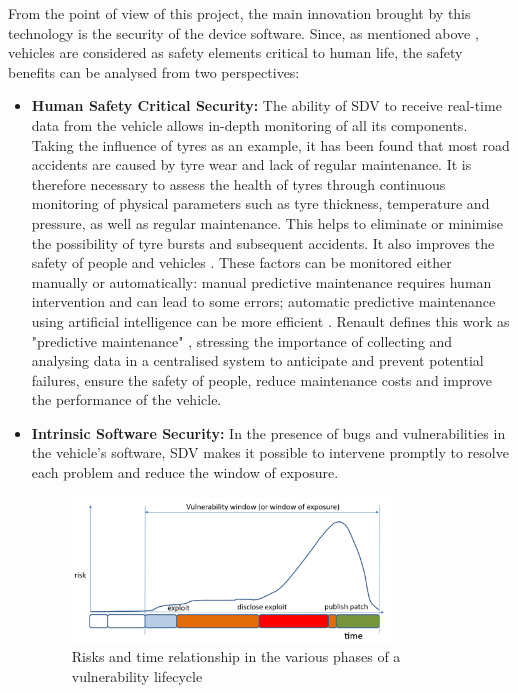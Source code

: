 From the point of view of this project, the main innovation brought by this technology is the security of the device software. Since, as mentioned above \cite{ISO26262}, vehicles are considered as safety elements critical to human life, the safety benefits can be analysed from two perspectives:
\begin{itemize}
    \item \textbf{Human Safety Critical Security:} The ability of SDV to receive real-time data from the vehicle allows in-depth monitoring of all its components. Taking the influence of tyres as an example, it has been found that most road accidents are caused by tyre wear and lack of regular maintenance. It is therefore necessary to assess the health of tyres through continuous monitoring of physical parameters such as tyre thickness, temperature and pressure, as well as regular maintenance. This helps to eliminate or minimise the possibility of tyre bursts and subsequent accidents. It also improves the safety of people and vehicles \cite{PredictDefectsOfTiresInHeavyVehicle}. These factors can be monitored either manually or automatically: manual predictive maintenance requires human intervention and can lead to some errors; automatic predictive maintenance using artificial intelligence can be more efficient \cite{AirPressureSystemFailurePrediction}. Renault defines this work as "predictive maintenance" \cite{SDVRenault}, stressing the importance of collecting and analysing data in a centralised system to anticipate and prevent potential failures, ensure the safety of people, reduce maintenance costs and improve the performance of the vehicle.
    \item \textbf{Intrinsic Software Security:} In the presence of bugs and vulnerabilities in the vehicle's software, SDV makes it possible to intervene promptly to resolve each problem and reduce the window of exposure.
    \begin{figure}[h]  %
        \centering
        \includegraphics[width=0.8\textwidth]{images/window_of_exposure.png}  %
        \caption{Risks and time relationship in the various phases of a vulnerability lifecycle}
        \label{fig:WindowOfExposure}
    \end{figure}


\end{itemize}
